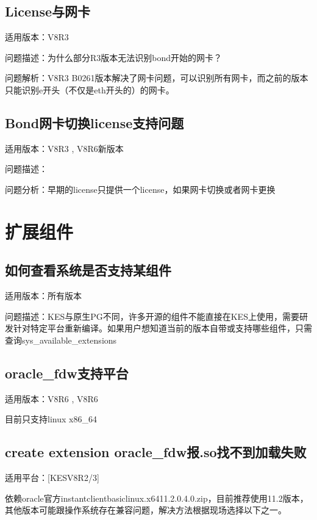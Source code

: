 \documentclass[a4,10pt,oneside,english]{sphinxmanual}
\begin{document}
\section{License与网卡}
\label{\detokenize{license:id7}}
适用版本：V8R3

问题描述：为什么部分R3版本无法识别bond开始的网卡？

问题解析：V8R3 B0261版本解决了网卡问题，可以识别所有网卡，而之前的版本只能识别e开头（不仅是eth开头的）的网卡。


\section{Bond网卡切换license支持问题}
\label{\detokenize{license:bondlicense}}
适用版本：V8R3 , V8R6新版本

问题描述：

问题分析：早期的license只提供一个license，如果网卡切换或者网卡更换


\chapter{扩展组件}
\label{\detokenize{extended-plug-in:id1}}\label{\detokenize{extended-plug-in::doc}}

\section{如何查看系统是否支持某组件}
\label{\detokenize{extended-plug-in:id2}}
适用版本：所有版本

问题描述：KES与原生PG不同，许多开源的组件不能直接在KES上使用，需要研发针对特定平台重新编译。如果用户想知道当前的版本自带或支持哪些组件，只需查询sys\_available\_extensions


\section{oracle\_fdw支持平台}
\label{\detokenize{extended-plug-in:oracle-fdw}}
适用版本：V8R6 , V8R6

目前只支持linux x86\_64


\section{create extension oracle\_fdw报.so找不到加载失败}
\label{\detokenize{extended-plug-in:create-extension-oracle-fdw-so}}
适用平台：{[}KESV8R2/3{]}

依赖oracle官方instantclient\sphinxhyphen{}basic\sphinxhyphen{}linux.x64\sphinxhyphen{}11.2.0.4.0.zip，目前推荐使用11.2版本，其他版本可能跟操作系统存在兼容问题，解决方法根据现场选择以下之一。
\end{document}
